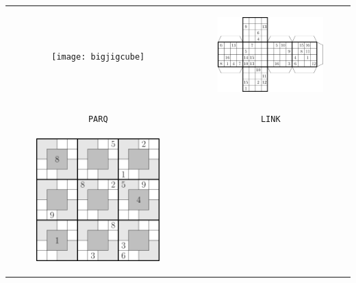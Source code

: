 \documentclass[12pt]{article}
\begin{document}
\begin{longtable}{cc}
\begin{minipage}{0.45\textwidth}
\begin{center}
		\texttt{[image: bigjigcube]}	
	\end{center}
\end{minipage} &
\begin{minipage}{0.45\textwidth}	
	\begin{center}
		\includegraphics[width=0.7\textwidth]{3dcube}	
	\end{center}
\end{minipage} 
\\
\\\pagebreak	
\texttt{PARQ} & \texttt{LINK}\\	
\begin{minipage}{0.45\textwidth}	
	\begin{center}
		\includegraphics[width=0.7\textwidth]{parquet}	
	\end{center}
\end{minipage} &
\begin{minipage}{0.45\textwidth}	
	\begin{center}

\end{center}
\end{minipage}
\end{longtable}
\end{document}
